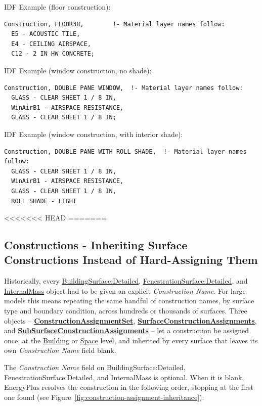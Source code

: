 IDF Example (floor construction):

\begin{lstlisting}
Construction, FLOOR38,        !- Material layer names follow:
  E5 - ACOUSTIC TILE,
  E4 - CEILING AIRSPACE,
  C12 - 2 IN HW CONCRETE;
\end{lstlisting}

IDF Example (window construction, no shade):

\begin{lstlisting}
Construction, DOUBLE PANE WINDOW,  !- Material layer names follow:
  GLASS - CLEAR SHEET 1 / 8 IN,
  WinAirB1 - AIRSPACE RESISTANCE,
  GLASS - CLEAR SHEET 1 / 8 IN;
\end{lstlisting}

IDF Example (window construction, with interior shade):

\begin{lstlisting}
Construction, DOUBLE PANE WITH ROLL SHADE,  !- Material layer names follow:
  GLASS - CLEAR SHEET 1 / 8 IN,
  WinAirB1 - AIRSPACE RESISTANCE,
  GLASS - CLEAR SHEET 1 / 8 IN,
  ROLL SHADE - LIGHT
\end{lstlisting}

<<<<<<< HEAD
=======
\subsection{Constructions - Inheriting Surface Constructions Instead of Hard-Assigning Them}\label{constructions---inheriting-surface-constructions-instead-of-hard-assigning-them}

Historically, every \hyperref[buildingsurfacedetailed]{BuildingSurface:Detailed}, \hyperref[fenestrationsurfacedetailed]{FenestrationSurface:Detailed}, and \hyperref[internalmass]{InternalMass} object had to be given an explicit \emph{Construction Name}. For large models this means repeating the same handful of construction names, by surface type and boundary condition, across hundreds or thousands of surfaces. Three objects -- \textbf{\hyperref[constructionassignmentset]{ConstructionAssignmentSet}}, \textbf{\hyperref[surfaceconstructionassignments]{SurfaceConstructionAssignments}}, and \textbf{\hyperref[subsurfaceconstructionassignments]{SubSurfaceConstructionAssignments}} -- let a construction be assigned once, at the \hyperref[building]{Building} or \hyperref[space]{Space} level, and inherited by every surface that leaves its own \emph{Construction Name} field blank.

The \emph{Construction Name} field on BuildingSurface:Detailed, FenestrationSurface:Detailed, and InternalMass is optional. When it is blank, EnergyPlus resolves the construction in the following order, stopping at the first one found (see Figure~\ref{fig:construction-assignment-inheritance}):


